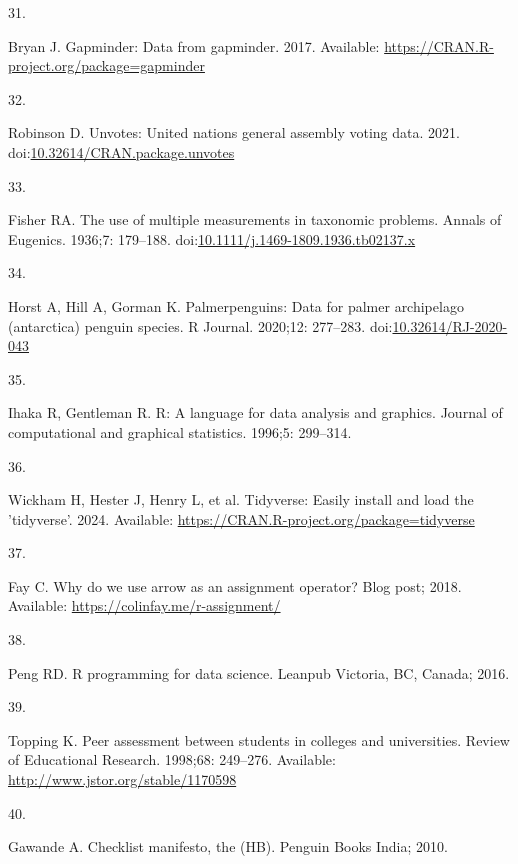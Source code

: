 \documentclass[
  10pt,
  letterpaper,
]{article}
\newlength{\cslhangindent}
\newlength{\csllabelwidth}
\newenvironment{CSLReferences}[2] %
 {\begin{list}{}{%
  \setlength{\itemindent}{0pt}
  \setlength{\leftmargin}{0pt}
  \setlength{\parsep}{0pt}
  \ifodd #1
   \setlength{\leftmargin}{\cslhangindent}
   \setlength{\itemindent}{-1\cslhangindent}
  \fi
  \setlength{\itemsep}{#2\baselineskip}}}
 {\end{list}}
\newcommand{\CSLLeftMargin}[1]{\parbox[t]{\csllabelwidth}{\strut#1\strut}}
\newcommand{\CSLRightInline}[1]{\parbox[t]{\linewidth - \csllabelwidth}{\strut#1\strut}}
\begin{document}
\begin{CSLReferences}{0}{1}
\CSLLeftMargin{31. }%
\CSLRightInline{Bryan J. Gapminder: Data from gapminder. 2017.
Available: \url{https://CRAN.R-project.org/package=gapminder}}

\CSLLeftMargin{32. }%
\CSLRightInline{Robinson D. Unvotes: United nations general assembly
voting data. 2021.
doi:\href{https://doi.org/10.32614/CRAN.package.unvotes}{10.32614/CRAN.package.unvotes}}

\CSLLeftMargin{33. }%
\CSLRightInline{Fisher RA. The use of multiple measurements in taxonomic
problems. Annals of Eugenics. 1936;7: 179--188.
doi:\href{https://doi.org/10.1111/j.1469-1809.1936.tb02137.x}{10.1111/j.1469-1809.1936.tb02137.x}}

\CSLLeftMargin{34. }%
\CSLRightInline{Horst A, Hill A, Gorman K. Palmerpenguins: Data for
palmer archipelago (antarctica) penguin species. R Journal. 2020;12:
277--283.
doi:\href{https://doi.org/10.32614/RJ-2020-043}{10.32614/RJ-2020-043}}

\CSLLeftMargin{35. }%
\CSLRightInline{Ihaka R, Gentleman R. R: A language for data analysis
and graphics. Journal of computational and graphical statistics. 1996;5:
299--314. }

\CSLLeftMargin{36. }%
\CSLRightInline{Wickham H, Hester J, Henry L, et al. Tidyverse: Easily
install and load the 'tidyverse'. 2024. Available:
\url{https://CRAN.R-project.org/package=tidyverse}}

\CSLLeftMargin{37. }%
\CSLRightInline{Fay C. Why do we use arrow as an assignment operator?
Blog post; 2018. Available: \url{https://colinfay.me/r-assignment/}}

\CSLLeftMargin{38. }%
\CSLRightInline{Peng RD. R programming for data science. Leanpub
Victoria, BC, Canada; 2016. }

\CSLLeftMargin{39. }%
\CSLRightInline{Topping K. Peer assessment between students in colleges
and universities. Review of Educational Research. 1998;68: 249--276.
Available: \url{http://www.jstor.org/stable/1170598}}

\CSLLeftMargin{40. }%
\CSLRightInline{Gawande A. Checklist manifesto, the (HB). Penguin Books
India; 2010. }


\end{CSLReferences}
\end{document}
